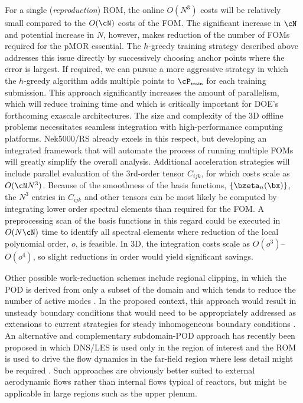    For a single ({\em reproduction}) ROM, the online $O(N^3)$ costs will
be relatively small compared to the $O(\cN)$ costs of the FOM.  The significant
increase in $\cN$ and potential increase in $N$, however, makes reduction of
the number of FOMs required for the pMOR essential.  The $h$-greedy training
strategy described above addresses this issue directly by
successively choosing anchor points where the error is largest.  If required,
we can pursue a more aggressive strategy in which the $h$-greedy algorithm adds
multiple points to $\cP_{\mbox{\tiny train}}$ for each training submission.
This approach significantly increases the amount of parallelism, which will
reduce training time and which is critically important for DOE's forthcoming
exascale architectures.
The size and complexity of the 3D offline problems necessitates seamless
integration with high-performance computing platforms.  Nek5000/RS already excels
in this respect, but developing an integrated framework that will automate the
process of running multiple FOMs will greatly simplify the overall analysis.
   Additional acceleration strategies will include parallel evaluation of the
3rd-order tensor $C_{ijk}$, for which costs scale as $O(\cN N^3)$.
   Because of the smoothness of the basis functions, $\{\bzeta_n(\bx) \}$, 
the $N^3$ entries in $C_{ijk}$ and other tensors can be most likely be
computed by integrating lower order spectral elements than required for the FOM.  
A preprocessing scan of the basis functions in this regard could be executed in
$O(N\cN)$ time to identify all spectral elements where reduction of the local
polynomial order, $o$, is feasible.  In 3D, the integration costs scale as
$O(o^3)$--$O(o^4)$, so slight reductions in order would yield significant
savings.

 Other possible work-reduction schemes include regional clipping, in which the
POD is derived from only a subset of the domain and which tends to reduce the
number of active modes \cite{merzari15a}.  In the proposed context, this
approach would result in unsteady boundary conditions that would need to be
appropriately addressed as extensions to current strategies for steady
inhomogeneous boundary conditions \cite{fick18}.
   An alternative and complementary subdomain-POD approach has recently
been proposed in which DNS/LES is used only in the region of interest
and the ROM is used to drive the flow dynamics in the far-field region where
less detail might be required \cite{bergmann18}.  Such approaches are obviously
better suited to external aerodynamic flows rather than internal flows typical
of reactors, but might be applicable in large regions such as the upper plenum.  


